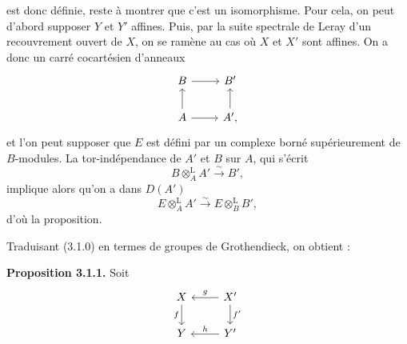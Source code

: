 est
donc définie, reste à montrer que c'est un isomorphisme. Pour cela, on peut d'abord supposer \(Y\) et \(Y'\) affines. Puis, par la suite spectrale de Leray d'un recouvrement ouvert de \(X\), on se ramène au cas où \(X\) et \(X'\) sont affines. On a donc un carré cocartésien d'anneaux
\[
\begin{tikzcd}
B\arrow[r] & B'\\
A\arrow[u]\arrow[r] & A'\arrow[u],
\end{tikzcd}
\]
et l'on peut supposer que \(E\) est défini par un complexe borné supérieurement de \(B\)-modules. La tor-indépendance de \(A'\) et \(B\) sur \(A\), qui s'écrit
\[
 B\otimes_A^{\mathrm L}A'\xrightarrow{\sim}B',
\]
implique alors qu'on a dans \(D(A')\)
\[
 E\otimes_A^{\mathrm L}A'\xrightarrow{\sim}E\otimes_B^{\mathrm L}B',
\]
d'où la proposition.

Traduisant (3.1.0) en termes de groupes de Grothendieck, on obtient :

\textbf{Proposition 3.1.1.} Soit
\[
\begin{tikzcd}
X \arrow[d,"f"'] & X' \arrow[l,"g"']\arrow[d,"f'"]\\
Y & Y' \arrow[l,"h"']
\end{tikzcd}
\]
